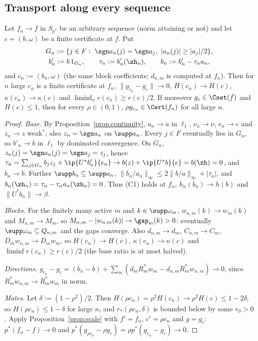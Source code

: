 \subsection{Transport along every sequence}

\begin{theorem}[Transport]\label{thm:transport}
Let $f_n\to f$ in $S_{p^*}$ be an arbitrary sequence \textup{(}norm
attaining or not\textup{)} and let $c=(b,\omega)$ be a finite certificate
at $f$.  Put
\begin{gather*}
 G_n:=\{j\in F:\ \sgn a_n(j)=\sgn a_j,\ |a_n(j)|\ge|a_j|/2\},\\
 b'_n:=b\,1_{G_n},\qquad \tau_n:=b'_n(\zh_n),\qquad b_n:=b'_n-\tau_na_n,
\end{gather*}
and $c_n:=(b_n,\omega)$ \textup{(}the same block coefficients; $d_{n,m}$ is
computed at $f_n$\textup{)}.  Then for $n$ large $c_n$ is a finite
certificate at $f_n$, $\|g_{c_n}-g_c\|\to0$, $H(c_n)\to H(c)$,
$\kappa(c_n)\to\kappa(c)$ and $\liminf_nr(c_n)\ge r(c)/2$.  If moreover
$g_c\in\Cset(f)$ and $H(c)\le1$, then for every $\rho\in(0,1)$,
$\rho g_{c_n}\in\Cert(f_n)$ for all large $n$.
\end{theorem}

\begin{proof}
\emph{Base.}  By Proposition~\ref{prop:continuity}, $a_n\to a$ in $\ell_1$,
$\nu_n\to\nu$, $e_n\to e$ and $z_n\to z$ weak$^*$; also $z_n=\sgn a_n$ on
$\supp a_n$.  Every $j\in F$ eventually lies in $G_n$, so $b'_n\to b$ in
$\ell_1$ by dominated convergence.  On $G_n$,
$z_n(j)=\sgn a_n(j)=\sgn a_j=z_j$, hence
$\tau_n=\sum_{j\in G_n}b_jz_j+\ip{U^*b'_n}{e_n}\to b(z)+\ip{U^*b}{e}=
b(\zh)=0$, and $b_n\to b$.  Further $\supp b_n\subseteq\supp a_n$,
$\|b_n/a_n\|_\infty\le2\|b/a\|_\infty+|\tau_n|$, and
$b_n(\zh_n)=\tau_n-\tau_na_n(\zh_n)=0$.  Thus (C1) holds at $f_n$,
$h_n(b_n)\to h(b)$ and $\|U^*b_n\|\to\beta$.

\emph{Blocks.}  For the finitely many active $m$ and $k\in\supp\omega_m$,
$w_{n,m}(k)\to w_m(k)$ and $M_{n,m}\to M_m$, so
$M_{n,m}-|w_{n,m}(k)|\to\gap_m(k)>0$: eventually $\supp\omega_m\subseteq
Q_{n,m}$ and the gaps converge.  Also $d_{n,m}\to d_m$, $C_{n,m}\to C_m$,
$D_mw_{n,m}\to D_mw_m$, so $H(c_n)\to H(c)$, $\kappa(c_n)\to\kappa(c)$ and
$\liminf r(c_n)\ge r(c)/2$ (the base ratio is at most halved).

\emph{Directions.}  $g_{c_n}-g_c=(b_n-b)+\sum_m(d_mR_m^*w_m-d_{n,m}R_m^*w_{n,m})
\to0$, since $R_m^*w_{n,m}\to R_m^*w_m$ in norm.

\emph{Mates.}  Let $\delta:=(1-\rho^2)/2$.  Then $H(\rho c_n)=\rho^2H(c_n)
\to\rho^2H(c)\le1-2\delta$, so $H(\rho c_n)\le1-\delta$ for large $n$, and
$r_*(\rho c_n,\delta)$ is bounded below by some $r_0>0$.  Apply
Proposition~\ref{prop:scale} with $f'=f_n$, $c'=\rho c_n$ and $g=g_c$:
$p^*(f_n-f)\to0$ and $p^*(g_{\rho c_n}-\rho g_c)=\rho p^*(g_{c_n}-g_c)\to0$.
\end{proof}

